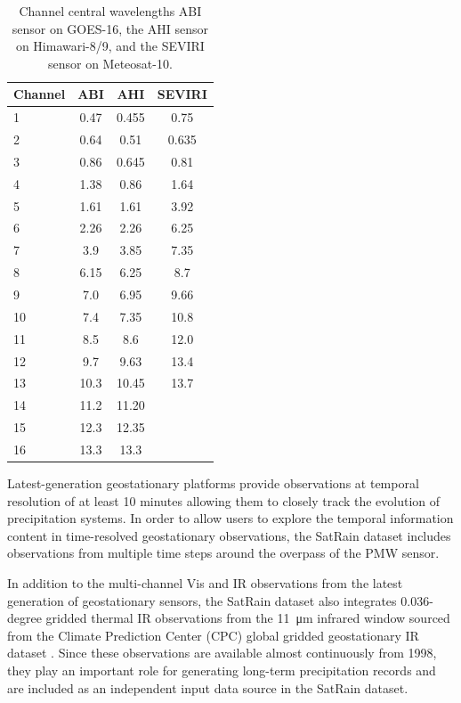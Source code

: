 \documentclass[11pt]{article}
\begin{document}
\begin{table}[htbp]
  \centering
    \begin{tabular}{lccc}
      \toprule
      Channel & ABI & AHI & SEVIRI \\
      \midrule
      1 & 0.47 & 0.455 & 0.75  \\
      2 & 0.64 & 0.51  & 0.635 \\
      3 & 0.86 & 0.645 & 0.81  \\
      4 & 1.38 & 0.86  & 1.64  \\
      5 & 1.61 & 1.61  & 3.92  \\
      6 & 2.26 & 2.26  & 6.25  \\
      7 & 3.9  & 3.85  & 7.35  \\
      8 & 6.15 & 6.25  & 8.7   \\
      9 & 7.0  & 6.95  & 9.66  \\
      10 & 7.4  & 7.35  & 10.8 \\
      11 & 8.5  & 8.6   & 12.0 \\
      12 & 9.7  & 9.63  & 13.4 \\
      13 & 10.3 & 10.45 & 13.7 \\
      14 & 11.2 & 11.20 &    \\
      15 & 12.3 & 12.35 &    \\
      16 & 13.3 & 13.3  &    \\
      \bottomrule
	\end{tabular}
	\caption{Channel central wavelengths ABI sensor on GOES-16, the AHI sensor on Himawari-8/9, and the SEVIRI sensor on Meteosat-10.}
\end{table}

Latest-generation geostationary platforms provide observations at temporal
resolution of at least 10 minutes allowing them to closely track the evolution of
precipitation systems. In order to allow users to explore the temporal
information content in time-resolved geostationary observations, the SatRain
dataset includes observations from multiple time steps around the overpass of
the PMW sensor.

In addition to the multi-channel Vis and IR observations from the latest
generation of geostationary sensors, the SatRain dataset also integrates
0.036-degree gridded thermal IR observations from the \SI{11}{\micro \meter}
infrared window sourced from the Climate Prediction Center (CPC) global gridded
geostationary IR dataset \citep{NCEP_CPC_L3_IR}. Since these observations are
available almost continuously from 1998, they play an important role for
generating long-term precipitation records and are included as an independent
input data source in the SatRain dataset.
\end{document}
